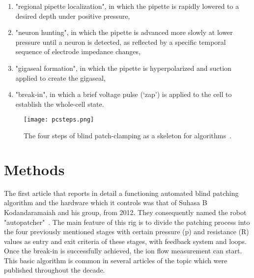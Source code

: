 \documentclass[12pt,a4paper]{report}
\begin{document}
\begin{enumerate}
    \item "regional pipette localization", in which the pipette is rapidly lowered to a desired depth under positive pressure,
    \item "neuron hunting", in which the pipette is advanced more slowly at lower pressure until a neuron is detected, as reflected by a specific temporal sequence of electrode impedance changes,
    \item "gigaseal formation", in which the pipette is hyperpolarized and suction applied to create the gigaseal,
    \item "break-in", in which a brief voltage pulse (‘zap’) is applied to the cell to establish the whole-cell state.
\end{enumerate}
\begin{figure}
    \centering
    \texttt{[image: pcsteps.png]}
    \caption{The four steps of blind patch-clamping as a skeleton for algorithms~\cite{kodandaramaiah2012}.}
    \label{fig:pcsteps}
\end{figure}

\section{Methods}
The first article that reports in detail a functioning automated blind patching algorithm and the hardware which it controls was that of Suhasa B Kodandaramaiah and his group, from 2012. They consequently named the robot "autopatcher"~\cite{kodandaramaiah2012}. The main feature of this rig is to divide the patching process into the four previously mentioned stages with certain pressure (p) and resistance (R) values as entry and exit criteria of these stages, with feedback system and loops. Once the break-in is successfully achieved, the ion flow measurement can start. This basic algorithm is common in several articles of the topic which were published throughout the decade.
\end{document}
